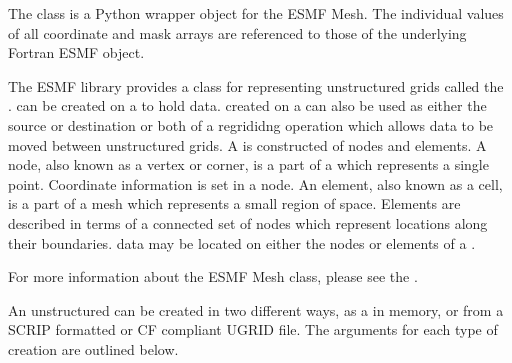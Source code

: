 \documentclass[letterpaper,10pt,english]{sphinxmanual}
\begin{document}
\begin{fulllineitems}
\label{\detokenize{mesh:ESMF.api.mesh.Mesh}}
The {\hyperref[\detokenize{mesh:ESMF.api.mesh.Mesh}]{}} class is a Python wrapper object for the ESMF Mesh.
The individual values of all coordinate and mask arrays are referenced to
those of the underlying Fortran ESMF object.

The ESMF library provides a class for representing unstructured grids called
the {\hyperref[\detokenize{mesh:ESMF.api.mesh.Mesh}]{}}. {\hyperref[\detokenize{field:ESMF.api.field.Field}]{}} can be created on a {\hyperref[\detokenize{mesh:ESMF.api.mesh.Mesh}]{}} to hold data. {\hyperref[\detokenize{field:ESMF.api.field.Field}]{}} created on a
{\hyperref[\detokenize{mesh:ESMF.api.mesh.Mesh}]{}} can also be used as either the source or destination or both of a
regrididng operation which allows data to be moved between unstructured
grids.  A {\hyperref[\detokenize{mesh:ESMF.api.mesh.Mesh}]{}} is constructed of nodes and elements. A node, also known as
a vertex or corner, is a part of a {\hyperref[\detokenize{mesh:ESMF.api.mesh.Mesh}]{}} which represents a single point.
Coordinate information is set in a node. An element, also known as a cell,
is a part of a mesh which represents a small region of space. Elements are
described in terms of a connected set of nodes which represent locations
along their boundaries. {\hyperref[\detokenize{field:ESMF.api.field.Field}]{}} data may be located on either the nodes or
elements of a {\hyperref[\detokenize{mesh:ESMF.api.mesh.Mesh}]{}}.

For more information about the ESMF Mesh class, please see the .

An unstructured {\hyperref[\detokenize{mesh:ESMF.api.mesh.Mesh}]{}} can be created in two different ways, as a {\hyperref[\detokenize{mesh:ESMF.api.mesh.Mesh}]{}} in
memory, or from a SCRIP formatted or CF compliant UGRID file. The arguments
for each type of {\hyperref[\detokenize{mesh:ESMF.api.mesh.Mesh}]{}} creation are outlined below.


\end{fulllineitems}
\end{document}

